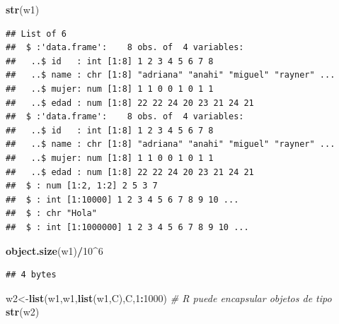 \documentclass[
]{book}
\newenvironment{Shaded}{\begin{snugshade}}{\end{snugshade}}
\newcommand{\CommentTok}[1]{\textcolor[rgb]{0.56,0.35,0.01}{\textit{#1}}}
\newcommand{\DecValTok}[1]{\textcolor[rgb]{0.00,0.00,0.81}{#1}}
\newcommand{\KeywordTok}[1]{\textcolor[rgb]{0.13,0.29,0.53}{\textbf{#1}}}
\newcommand{\NormalTok}[1]{#1}
\newcommand{\OperatorTok}[1]{\textcolor[rgb]{0.81,0.36,0.00}{\textbf{#1}}}
\begin{document}
\begin{Shaded}
\begin{Highlighting}[]
\KeywordTok{str}\NormalTok{(w1)}
\end{Highlighting}
\end{Shaded}

\begin{verbatim}
## List of 6
##  $ :'data.frame':    8 obs. of  4 variables:
##   ..$ id   : int [1:8] 1 2 3 4 5 6 7 8
##   ..$ name : chr [1:8] "adriana" "anahi" "miguel" "rayner" ...
##   ..$ mujer: num [1:8] 1 1 0 0 1 0 1 1
##   ..$ edad : num [1:8] 22 22 24 20 23 21 24 21
##  $ :'data.frame':    8 obs. of  4 variables:
##   ..$ id   : int [1:8] 1 2 3 4 5 6 7 8
##   ..$ name : chr [1:8] "adriana" "anahi" "miguel" "rayner" ...
##   ..$ mujer: num [1:8] 1 1 0 0 1 0 1 1
##   ..$ edad : num [1:8] 22 22 24 20 23 21 24 21
##  $ : num [1:2, 1:2] 2 5 3 7
##  $ : int [1:10000] 1 2 3 4 5 6 7 8 9 10 ...
##  $ : chr "Hola"
##  $ : int [1:1000000] 1 2 3 4 5 6 7 8 9 10 ...
\end{verbatim}

\begin{Shaded}
\begin{Highlighting}[]
\KeywordTok{object.size}\NormalTok{(w1)}\OperatorTok{/}\DecValTok{10}\OperatorTok{^}\DecValTok{6}
\end{Highlighting}
\end{Shaded}

\begin{verbatim}
## 4 bytes
\end{verbatim}

\begin{Shaded}
\begin{Highlighting}[]
\NormalTok{w2<-}\KeywordTok{list}\NormalTok{(w1,w1,}\KeywordTok{list}\NormalTok{(w1,C),C,}\DecValTok{1}\OperatorTok{:}\DecValTok{1000}\NormalTok{) }\CommentTok{# R puede encapsular objetos de tipo}
\KeywordTok{str}\NormalTok{(w2)}
\end{Highlighting}
\end{Shaded}
\end{document}
